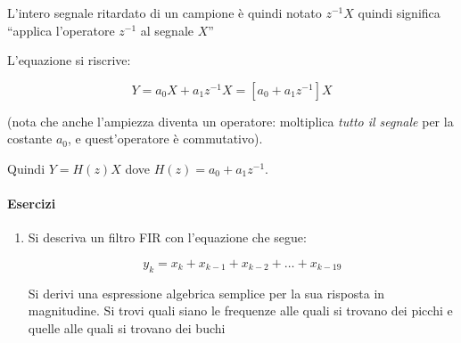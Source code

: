 	L'intero segnale ritardato di un campione \`e quindi notato $z^{-1} X$ quindi
		significa ``applica l'operatore $z^{-1}$ al segnale $X$''

		L'equazione si riscrive:

		 \begin{equation}
		  Y = a_0 X + a_1 z^{-1} X = \left [ a_0 + a_1 z^{-1} \right ] X
		 \end{equation}

		(nota che anche l'ampiezza diventa un operatore: moltiplica \emph{tutto il
		segnale} per la costante $a_0$, e quest'operatore \`e commutativo).

	Quindi $Y = H(z) X$ dove $H(z) = a_0 + a_1 z^{-1}$.


\paragraph{Esercizi}

\begin{enumerate}

	\item Si descriva un filtro FIR con l'equazione che segue:

					\begin{equation}
						y_k = x_k + x_{k-1} + x_{k-2} + \ldots + x_{k-19}
					\end{equation}

				Si derivi una espressione algebrica semplice per la sua risposta in
				magnitudine. Si trovi quali siano le frequenze alle quali si trovano
				dei picchi e quelle alle quali si trovano dei buchi

\end{enumerate}

